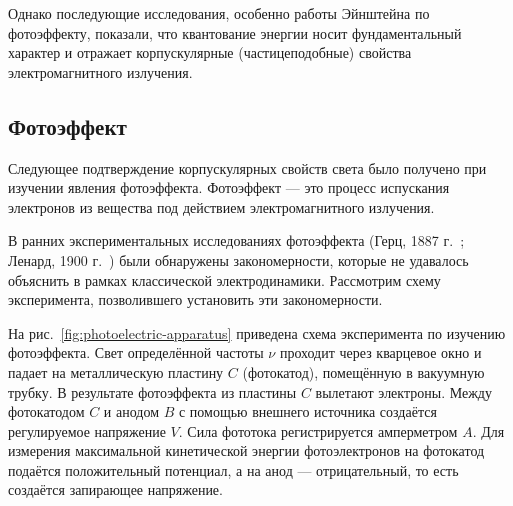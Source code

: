 \documentclass[a4paper, 12pt]{article}
\begin{document}
Однако последующие исследования, особенно работы Эйнштейна по фотоэффекту, показали,
что квантование энергии носит фундаментальный характер и отражает корпускулярные (частицеподобные)
свойства электромагнитного излучения.

\subsection{Фотоэффект}

Следующее подтверждение корпускулярных свойств света было получено при изучении
явления фотоэффекта. Фотоэффект --- это процесс испускания электронов из вещества
под действием электромагнитного излучения.

В ранних экспериментальных исследованиях фотоэффекта (Герц, 1887 г.~\cite{Hertz1887}; Ленард,
1900 г.~\cite{Lenard1900}) были обнаружены закономерности, которые не удавалось
объяснить в рамках классической электродинамики. Рассмотрим схему эксперимента,
позволившего установить эти закономерности.

На рис.~\ref{fig:photoelectric-apparatus} приведена схема эксперимента по
изучению фотоэффекта. Свет определённой частоты $\nu$ проходит через кварцевое
окно и падает на металлическую пластину $C$ (фотокатод), помещённую в
вакуумную трубку. В результате фотоэффекта из пластины $C$ вылетают электроны.
Между фотокатодом $C$ и анодом $B$ с помощью внешнего источника создаётся
регулируемое напряжение $V$. Сила фототока регистрируется амперметром $A$.
Для измерения максимальной кинетической энергии фотоэлектронов на фотокатод
подаётся положительный потенциал, а на анод --- отрицательный, то есть
создаётся запирающее напряжение.
\end{document}
